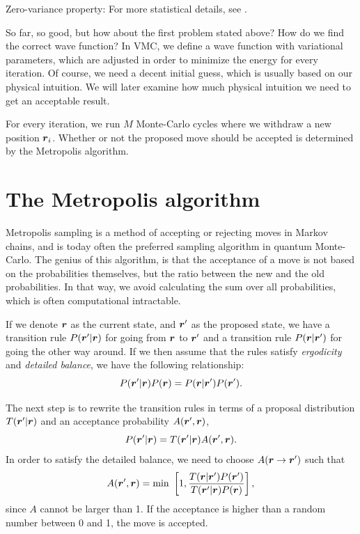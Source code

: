 Zero-variance property: 
For more statistical details, see \cite{deb_variational_2014}. 

So far, so good, but how about the first problem stated above? How do we find the correct wave function? In VMC, we define a wave function with variational parameters, which are adjusted in order to minimize the energy for every iteration. Of course, we need a decent initial guess, which is usually based on our physical intuition. We will later examine how much physical intuition we need to get an acceptable result. 

For every iteration, we run $M$ Monte-Carlo cycles where we withdraw a new position $\boldsymbol{{r}}_i$. Whether or not the proposed move should be accepted is determined by the Metropolis algorithm.

\section{The Metropolis algorithm}
Metropolis sampling is a method of accepting or rejecting moves in Markov chains, and is today often the preferred sampling algorithm in quantum Monte-Carlo. The genius of this algorithm, is that the acceptance of a move is not based on the probabilities themselves, but the ratio between the new and the old probabilities. In that way, we avoid calculating the sum over all probabilities, which is often computational intractable. 

If we denote $\boldsymbol{{r}}$ as the current state, and $\boldsymbol{{r}}'$ as the proposed state, we have a transition rule $P(\boldsymbol{{r}}'|\boldsymbol{{r}})$ for going from $\boldsymbol{{r}}$ to $\boldsymbol{{r}}'$ and a transition rule $P(\boldsymbol{{r}}|\boldsymbol{{r}}')$ for going the other way around. If we then assume that the rules satisfy \textit{ergodicity} and \textit{detailed balance}, we have the following relationship:
\begin{equation}
P(\boldsymbol{{r}}'|\boldsymbol{{r}})P(\boldsymbol{{r}})=P(\boldsymbol{{r}}|\boldsymbol{{r}}')P(\boldsymbol{{r}}').
\end{equation}

The next step is to rewrite the transition rules in terms of a proposal distribution $T(\boldsymbol{{r}}'|\boldsymbol{{r}})$ and an acceptance probability $A(\boldsymbol{{r}}',\boldsymbol{{r}})$,
\begin{equation}
P(\boldsymbol{{r}}'|\boldsymbol{{r}})=T(\boldsymbol{{r}}'|\boldsymbol{{r}})A(\boldsymbol{{r}}',\boldsymbol{{r}}).
\end{equation}
In order to satisfy the detailed balance, we need to choose $A(\boldsymbol{{r}}\rightarrow\boldsymbol{{r}}')$ such that
\begin{equation}
A(\boldsymbol{{r}}',\boldsymbol{{r}})=\text{min }\left[1,\frac{T(\boldsymbol{{r}}|\boldsymbol{{r}}')P(\boldsymbol{{r}}')}{T(\boldsymbol{{r}}'|\boldsymbol{{r}})P(\boldsymbol{{r}})}\right],
\label{eq:acceptance}
\end{equation}
since $A$ cannot be larger than 1. If the acceptance is higher than a random number between 0 and 1, the move is accepted.

